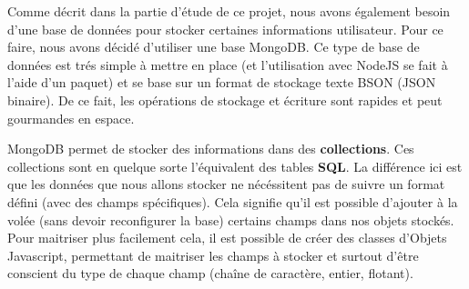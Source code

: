 Comme décrit dans la partie d'étude de ce projet, nous avons également besoin d'une base de données pour stocker certaines informations utilisateur.
Pour ce faire, nous avons décidé d'utiliser une base MongoDB. Ce type de base de données est trés simple à mettre en place (et l'utilisation avec NodeJS se fait à l'aide d'un paquet) et se base sur un format de stockage texte BSON (JSON binaire). De ce fait, les opérations de stockage et écriture sont rapides et peut gourmandes en espace.

MongoDB permet de stocker des informations dans des \textbf{collections}. Ces collections sont en quelque sorte l'équivalent des tables \textbf{SQL}. La différence ici est que les données que nous allons stocker ne nécéssitent pas de suivre un format défini (avec des champs spécifiques). Cela signifie qu'il est possible d'ajouter à la volée (sans devoir reconfigurer la base) certains champs dans nos objets stockés. Pour maitriser plus facilement cela, il est possible de créer des classes d'Objets Javascript, permettant de maitriser les champs à stocker et surtout d'être conscient du type de chaque champ (chaîne de caractère, entier, flotant).